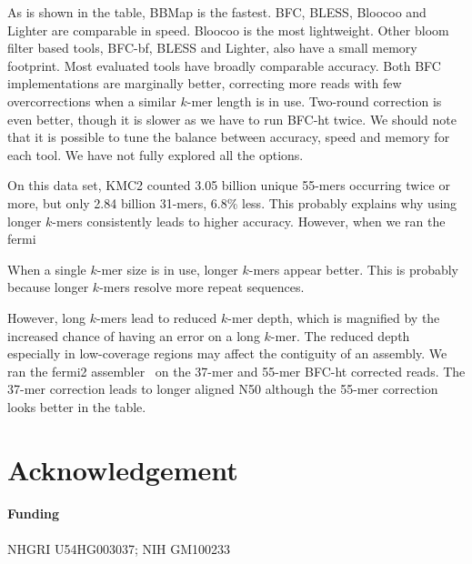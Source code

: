 \documentclass{bioinfo}
\begin{document}
As is shown in the table, BBMap is the fastest. BFC, BLESS, Bloocoo and Lighter
are comparable in speed. Bloocoo is the most lightweight. Other bloom filter
based tools, BFC-bf, BLESS and Lighter, also have a small memory footprint.
Most evaluated tools have broadly comparable accuracy. Both BFC implementations
are marginally better, correcting more reads with few overcorrections when a
similar $k$-mer length is in use. Two-round correction is even better, though
it is slower as we have to run BFC-ht twice. We should note that it is possible
to tune the balance between accuracy, speed and memory for each tool. We have
not fully explored all the options.

On this data set, KMC2 counted 3.05 billion unique 55-mers occurring twice or
more, but only 2.84 billion 31-mers, 6.8\% less. This probably explains why
using longer $k$-mers consistently leads to higher accuracy. However, when
we ran the fermi 



When a single $k$-mer size is in use, longer $k$-mers appear better. This is
probably because longer $k$-mers resolve more repeat sequences.


However, long $k$-mers lead to reduced $k$-mer depth,
which is magnified by the increased chance of having an error on a long $k$-mer.
The reduced depth especially in low-coverage regions may affect the contiguity
of an assembly. We ran the fermi2 assembler~\citep{Li:2012fk} on the 37-mer
and 55-mer BFC-ht corrected reads. The 37-mer correction leads to longer
aligned N50 although the 55-mer correction looks better in the table.

\section*{Acknowledgement}
\paragraph{Funding\textcolon} NHGRI U54HG003037; NIH GM100233


\end{document}
